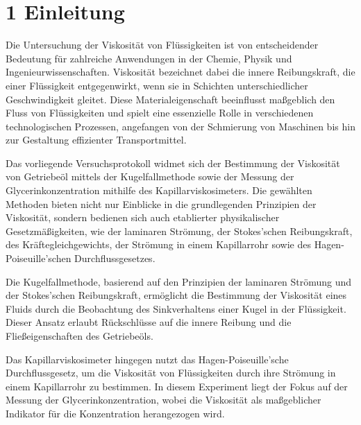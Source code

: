 \chapter*{1 Einleitung}
\setcounter{chapter}{1}
\setcounter{section}{0}
\setcounter{subsection}{0}

Die Untersuchung der Viskosität von Flüssigkeiten ist von entscheidender Bedeutung für zahlreiche Anwendungen in der Chemie, Physik und Ingenieurwissenschaften. Viskosität bezeichnet dabei die innere Reibungskraft, die einer Flüssigkeit entgegenwirkt, wenn sie in Schichten unterschiedlicher Geschwindigkeit gleitet. Diese Materialeigenschaft beeinflusst maßgeblich den Fluss von Flüssigkeiten und spielt eine essenzielle Rolle in verschiedenen technologischen Prozessen, angefangen von der Schmierung von Maschinen bis hin zur Gestaltung effizienter Transportmittel.

Das vorliegende Versuchsprotokoll widmet sich der Bestimmung der Viskosität von Getriebeöl mittels der Kugelfallmethode sowie der Messung der Glycerinkonzentration mithilfe des Kapillarviskosimeters. Die gewählten Methoden bieten nicht nur Einblicke in die grundlegenden Prinzipien der Viskosität, sondern bedienen sich auch etablierter physikalischer Gesetzmäßigkeiten, wie der laminaren Strömung, der Stokes'schen Reibungskraft, des Kräftegleichgewichts, der Strömung in einem Kapillarrohr sowie des Hagen-Poiseuille'schen Durchflussgesetzes.

Die Kugelfallmethode, basierend auf den Prinzipien der laminaren Strömung und der Stokes'schen Reibungskraft, ermöglicht die Bestimmung der Viskosität eines Fluids durch die Beobachtung des Sinkverhaltens einer Kugel in der Flüssigkeit. Dieser Ansatz erlaubt Rückschlüsse auf die innere Reibung und die Fließeigenschaften des Getriebeöls.

Das Kapillarviskosimeter hingegen nutzt das Hagen-Poiseuille'sche Durchflussgesetz, um die Viskosität von Flüssigkeiten durch ihre Strömung in einem Kapillarrohr zu bestimmen. In diesem Experiment liegt der Fokus auf der Messung der Glycerinkonzentration, wobei die Viskosität als maßgeblicher Indikator für die Konzentration herangezogen wird.